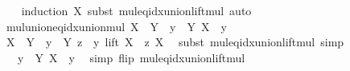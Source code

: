 \begin{isabellebody}
%
\isadelimproof
\ \ %
\endisadelimproof
%
\isatagproof
{}\isamarkupfalse%
\ {\isacharparenleft}{\kern0pt}induction\ X{\isacharcomma}{\kern0pt}\ subst\ mul{\isacharunderscore}{\kern0pt}eq{\isacharunderscore}{\kern0pt}idx{\isacharunderscore}{\kern0pt}union{\isacharunderscore}{\kern0pt}lift{\isacharunderscore}{\kern0pt}mul{\isacharparenright}{\kern0pt}\ auto%
\endisatagproof
{\isafoldproof}%
%
\isadelimproof
\isanewline
%
\endisadelimproof
\isanewline
{}\isamarkupfalse%
\ mul{\isacharunderscore}{\kern0pt}union{\isacharunderscore}{\kern0pt}eq{\isacharunderscore}{\kern0pt}idx{\isacharunderscore}{\kern0pt}union{\isacharunderscore}{\kern0pt}mul{\isacharcolon}{\kern0pt}\ {\isachardoublequoteopen}X\ {\isacharasterisk}{\kern0pt}\ {\isasymUnion}Y\ {\isacharequal}{\kern0pt}\ {\isacharparenleft}{\kern0pt}{\isasymUnion}y\ {\isasymin}\ Y{\isachardot}{\kern0pt}\ X\ {\isacharasterisk}{\kern0pt}\ y{\isacharparenright}{\kern0pt}{\isachardoublequoteclose}\isanewline
%
\isadelimproof
%
\endisadelimproof
%
\isatagproof
{}\isamarkupfalse%
\ {\isacharminus}{\kern0pt}\isanewline
\ \ \isamarkupfalse%
\ {\isachardoublequoteopen}X\ {\isacharasterisk}{\kern0pt}\ {\isasymUnion}Y\ {\isacharequal}{\kern0pt}\ {\isacharparenleft}{\kern0pt}{\isasymUnion}y\ {\isasymin}\ Y{\isachardot}{\kern0pt}\ {\isasymUnion}z\ {\isasymin}\ y{\isachardot}{\kern0pt}\ lift\ {\isacharparenleft}{\kern0pt}X\ {\isacharasterisk}{\kern0pt}\ z{\isacharparenright}{\kern0pt}\ X{\isacharparenright}{\kern0pt}{\isachardoublequoteclose}\ \isamarkupfalse%
\ {\isacharparenleft}{\kern0pt}subst\ mul{\isacharunderscore}{\kern0pt}eq{\isacharunderscore}{\kern0pt}idx{\isacharunderscore}{\kern0pt}union{\isacharunderscore}{\kern0pt}lift{\isacharunderscore}{\kern0pt}mul{\isacharparenright}{\kern0pt}\ simp\isanewline
\ \ \isamarkupfalse%
\ \isamarkupfalse%
\ {\isachardoublequoteopen}{\isachardot}{\kern0pt}{\isachardot}{\kern0pt}{\isachardot}{\kern0pt}\ {\isacharequal}{\kern0pt}\ {\isacharparenleft}{\kern0pt}{\isasymUnion}y\ {\isasymin}\ Y{\isachardot}{\kern0pt}\ X\ {\isacharasterisk}{\kern0pt}\ y{\isacharparenright}{\kern0pt}{\isachardoublequoteclose}\ \isamarkupfalse%
\ {\isacharparenleft}{\kern0pt}simp\ flip{\isacharcolon}{\kern0pt}\ mul{\isacharunderscore}{\kern0pt}eq{\isacharunderscore}{\kern0pt}idx{\isacharunderscore}{\kern0pt}union{\isacharunderscore}{\kern0pt}lift{\isacharunderscore}{\kern0pt}mul{\isacharparenright}{\kern0pt}\isanewline
\ \ \isamarkupfalse%
\ \isamarkupfalse%

\end{isabellebody}

